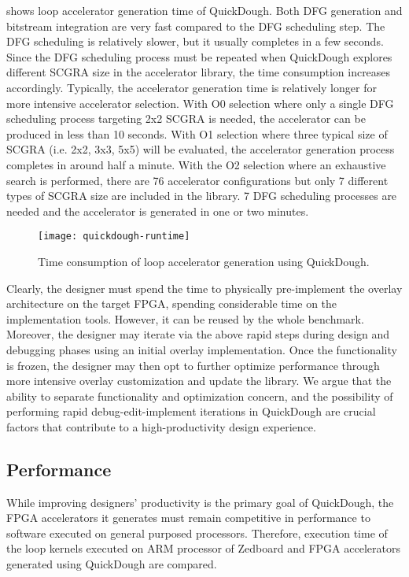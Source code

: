  shows loop accelerator generation time of QuickDough.
Both DFG generation and bitstream integration are very fast compared to the DFG scheduling step. The DFG
scheduling is relatively slower, but it usually completes in a few seconds.
Since the DFG scheduling process must be repeated when QuickDough explores different SCGRA size in
the accelerator library, the time consumption increases accordingly. Typically, the accelerator
generation time is relatively longer for more intensive accelerator selection. With O0 selection
where only a single DFG scheduling process targeting 2x2 SCGRA is needed, the accelerator can be
produced in less than 10 seconds. With O1 selection where three typical size of SCGRA (i.e. 2x2,
3x3, 5x5) will be evaluated, the accelerator
generation process completes in around half a minute. With the O2 selection where an exhaustive
search is performed, there are 76 accelerator configurations but only 7 different types of SCGRA
size are included in the library. 7 DFG scheduling processes are needed and the accelerator is
generated in one or two minutes.

\begin{figure}
\centering
\texttt{[image: quickdough-runtime]}
\caption{Time consumption of loop accelerator generation using QuickDough.}
\label{fig:SCGRA-Overlay-Compilation-Time}
\end{figure}

Clearly, the designer must spend the time to physically pre-implement 
the overlay architecture on the target FPGA, spending considerable 
time on the implementation tools. However, it can be reused by the whole benchmark.
Moreover, the designer may iterate via the above rapid steps during 
design and debugging phases using an initial overlay implementation.
Once the functionality is frozen, the designer may then opt to further optimize 
performance through more intensive overlay customization and update the library. 
We argue that the ability to separate functionality and optimization 
concern, and the possibility of performing rapid debug-edit-implement 
iterations in QuickDough are crucial factors that contribute to a high-productivity 
design experience.

\subsection{Performance} \label{subsec:acc-perf}
While improving designers' productivity is the primary goal of QuickDough, the FPGA accelerators it
generates must remain competitive in performance to software executed on general 
purposed processors. Therefore, execution time of the loop kernels executed on ARM 
processor of Zedboard and FPGA accelerators generated using QuickDough are compared.

